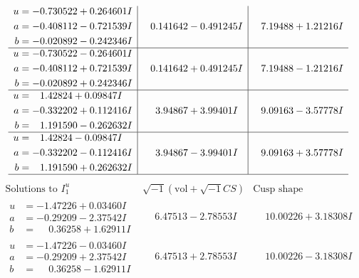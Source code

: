 \documentclass[1p]{elsarticle_modified}
\theoremstyle{definition}
\newcommand{\I}{\sqrt{-1}}
\begin{document}
$$\begin{array}{c|c|c}
\begin{aligned}
u &= -0.730522 + 0.264601 I \\
a &= -0.408112 - 0.721539 I \\
b &= -0.020892 - 0.242346 I\end{aligned}
 & \phantom{-}0.141642 - 0.491245 I & \phantom{-}7.19488 + 1.21216 I \\ \hline\begin{aligned}
u &= -0.730522 - 0.264601 I \\
a &= -0.408112 + 0.721539 I \\
b &= -0.020892 + 0.242346 I\end{aligned}
 & \phantom{-}0.141642 + 0.491245 I & \phantom{-}7.19488 - 1.21216 I \\ \hline\begin{aligned}
u &= \phantom{-}1.42824 + 0.09847 I \\
a &= -0.332202 + 0.112416 I \\
b &= \phantom{-}1.191590 - 0.262632 I\end{aligned}
 & \phantom{-}3.94867 + 3.99401 I & \phantom{-}9.09163 - 3.57778 I \\ \hline\begin{aligned}
u &= \phantom{-}1.42824 - 0.09847 I \\
a &= -0.332202 - 0.112416 I \\
b &= \phantom{-}1.191590 + 0.262632 I\end{aligned}
 & \phantom{-}3.94867 - 3.99401 I & \phantom{-}9.09163 + 3.57778 I\\
 \hline 
 \end{array}$$\newpage$$\begin{array}{c|c|c}  
\text{Solutions to }I^u_{1}& \I (\text{vol} + \sqrt{-1}CS) & \text{Cusp shape}\\
 \hline 
\begin{aligned}
u &= -1.47226 + 0.03460 I \\
a &= -0.29209 - 2.37542 I \\
b &= \phantom{-}0.36258 + 1.62911 I\end{aligned}
 & \phantom{-}6.47513 - 2.78553 I & \phantom{-}10.00226 + 3.18308 I \\ \hline\begin{aligned}
u &= -1.47226 - 0.03460 I \\
a &= -0.29209 + 2.37542 I \\
b &= \phantom{-}0.36258 - 1.62911 I\end{aligned}
 & \phantom{-}6.47513 + 2.78553 I & \phantom{-}10.00226 - 3.18308 I \\ \hline\begin{aligned}

\end{aligned}
\end{array}$$
\end{document}
